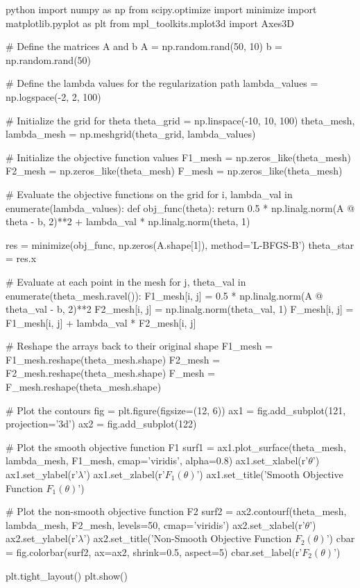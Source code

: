 python
import numpy as np
from scipy.optimize import minimize
import matplotlib.pyplot as plt
from mpl_toolkits.mplot3d import Axes3D

# Define the matrices A and b
A = np.random.rand(50, 10)
b = np.random.rand(50)

# Define the lambda values for the regularization path
lambda_values = np.logspace(-2, 2, 100)

# Initialize the grid for theta
theta_grid = np.linspace(-10, 10, 100)
theta_mesh, lambda_mesh = np.meshgrid(theta_grid, lambda_values)

# Initialize the objective function values
F1_mesh = np.zeros_like(theta_mesh)
F2_mesh = np.zeros_like(theta_mesh)
F_mesh = np.zeros_like(theta_mesh)

# Evaluate the objective functions on the grid
for i, lambda_val in enumerate(lambda_values):
    def obj_func(theta):
        return 0.5 * np.linalg.norm(A @ theta - b, 2)**2 + lambda_val * np.linalg.norm(theta, 1)
    
    res = minimize(obj_func, np.zeros(A.shape[1]), method='L-BFGS-B')
    theta_star = res.x
    
    # Evaluate at each point in the mesh
    for j, theta_val in enumerate(theta_mesh.ravel()):
        F1_mesh[i, j] = 0.5 * np.linalg.norm(A @ theta_val - b, 2)**2
        F2_mesh[i, j] = np.linalg.norm(theta_val, 1)
        F_mesh[i, j] = F1_mesh[i, j] + lambda_val * F2_mesh[i, j]

# Reshape the arrays back to their original shape
F1_mesh = F1_mesh.reshape(theta_mesh.shape)
F2_mesh = F2_mesh.reshape(theta_mesh.shape)
F_mesh = F_mesh.reshape(theta_mesh.shape)

# Plot the contours
fig = plt.figure(figsize=(12, 6))
ax1 = fig.add_subplot(121, projection='3d')
ax2 = fig.add_subplot(122)

# Plot the smooth objective function F1
surf1 = ax1.plot_surface(theta_mesh, lambda_mesh, F1_mesh, cmap='viridis', alpha=0.8)
ax1.set_xlabel(r'$\theta$')
ax1.set_ylabel(r'$\lambda$')
ax1.set_zlabel(r'$F_1(\theta)$')
ax1.set_title('Smooth Objective Function $F_1(\theta)$')

# Plot the non-smooth objective function F2
surf2 = ax2.contourf(theta_mesh, lambda_mesh, F2_mesh, levels=50, cmap='viridis')
ax2.set_xlabel(r'$\theta$')
ax2.set_ylabel(r'$\lambda$')
ax2.set_title('Non-Smooth Objective Function $F_2(\theta)$')
cbar = fig.colorbar(surf2, ax=ax2, shrink=0.5, aspect=5)
cbar.set_label(r'$F_2(\theta)$')

plt.tight_layout()
plt.show()